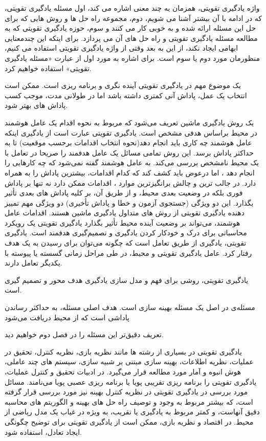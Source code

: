 واژه یادگیری تقویتی، همزمان به چند معنی اشاره می کند، اول مسئله یادگیری تقویتی، که در ادامه با آن بیشتر آشنا می شویم،  دوم، مجموعه راه حل ها و روش هایی که برای حل این مسئله ارائه شده و به خوبی کار می کنند و سوم، حوزه یادگیری تقویتی که به مطالعه مسئله یادگیری تقویتی و راه حل های آن می پردازد. برای اینکه این چندمعنایی ابهامی ایجاد نکند، از این به بعد وقتی از واژه یادگیری تقویتی استفاده می کنیم، منظورمان  مورد دوم یا سوم است. برای اشاره به مورد اول از عبارت «مسئله یادگیری تقویتی» استفاده خواهیم کرد. 

یک موضوع مهم در یادگیری تقویتی آینده نگری و برنامه ریزی است. ممکن است انتخاب یک عمل، پاداش آنی کمتری داشته باشد اما در طولانی مدت، موجب کسب پاداش های بهتر شود. 

یک روش یادگیری ماشین تعریف می‌شود که مربوط به نحوه اقدام یک عامل هوشمند  در محیط براساس هدفی مشخص است. یادگیری تقویتی عبارت است از یادگیری اینکه عامل هوشمند چه کاری باید انجام دهد(نحوه انتخاب اقدامات برحسب موقعیت) تا به حداکثر پاداش برسد. این روش تمامی‌ مسائل یک عامل هدفمند را صریحا در تعامل با یک محیط نامشخص بررسی می‌کند. به عامل هوشمند گفته نمی‌شود که چه کارهایی را انجام دهد ، اما درعوض باید کشف کند که کدام اقدامات، بیشترین پاداش را به همراه دارد. در جالب ترین و چالش برانگیزترین موارد ، اقدامات ممکن دارد نه تنها بر پاداش فوری بلکه در وضعیت بعدی محیط، و از طریق آن، بر کلیه پاداش های بعدی تأثیر بگذارد. این دو ویژگی (جستجوی آزمون و خطا و پاداش تأخیری) دو ویژگی مهم تمییز دهنده یادگیری تقویتی از روش های متداول یادگیری ماشین هستند.
اقدامات عامل هوشمند، می‌تواند بر وضعیت آینده محیط تأثیر بگذارد
یادگیری تقویتی یک رویکرد محاسباتی برای درک و خودکار کردن یادگیری و تصمیم‌گیری هدفمند است.
یادگیری تقویتی، یادگیری از  طریق تعامل است که چگونه می‌توان برای رسیدن به یک هدف رفتار کرد.
عامل یادگیری تقویتی و محیط، در طی مراحل زمانی گسسته یا پیوسته با یکدیگر تعامل دارند.

یادگیری تقویتی، روشی برای فهم و مدل سازی یادگیری هدف محور و تصمیم گیری است.



مسئله‌ی  در اصل یک مسئله بهینه سازی است. هدف اصلی مسئله، به حداکثر رساندن پاداشی است که از محیط دریافت می‌شود

تعریف دقیق‌تر این مسئله را در فصل دوم خواهیم دید.

یادگیری تقویتی
در بسیاری از رشته ها مانند نظریه بازی، نظریه کنترل، تحقیق در عملیات، نظریه اطلاعات، بهینه سازی مبتنی بر شبیه سازی، سیستم های چند عاملی، هوش انبوه و آمار مورد مطالعه قرار می‌گیرد. در ادبیات تحقیق و کنترل عملیات، یادگیری تقویتی را برنامه ریزی تقریبی پویا   یا برنامه ریزی عصبی پویا   می‌نامند. مسائل مورد بررسی در یادگیری تقویتی در نظریه کنترل بهینه  نیز مورد بررسی قرار گرفته است، که بیشتر مربوط به وجود و توصیف راه حل های بهینه و الگوریتم های محاسبه دقیق آنهاست، و کمتر مربوط به یادگیری یا تقریب، به ویژه در غیاب یک مدل ریاضی از محیط. در اقتصاد و نظریه بازی، ممکن است از یادگیری تقویتی برای توضیح چگونگی ایجاد تعادل، استفاده شود.


